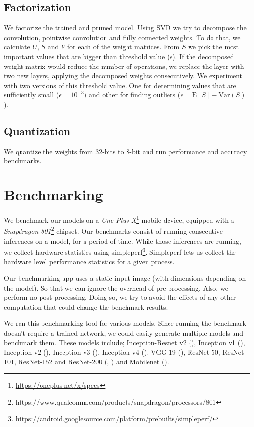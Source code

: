 \subsection{Factorization}
We factorize the trained and pruned model. Using SVD we try to decompose the convolution, pointwise convolution and fully connected weights. To do that, we calculate $U$, $S$ and $V$ for each of the weight matrices. From $S$ we pick the most important values that are bigger than threshold value ($\epsilon$). If the decomposed weight matrix would reduce the number of operations, we replace the layer with two new layers, applying the decomposed weights consecutively. We experiment with two versions of this threshold value. One for determining values that are sufficiently small ($\epsilon = 10^{-3}$) and other for finding outliers ($\epsilon = \text{E}[S] - \text{Var}(S)$).

\subsection{Quantization}
We quantize the weights from 32-bits to 8-bit and run performance and accuracy benchmarks.

\section{Benchmarking}
We benchmark our models on a \textit{One Plus X}\footnote{\url{https://oneplus.net/x/specs}} mobile device, equipped with a \textit{Snapdragon 801}\footnote{\url{https://www.qualcomm.com/products/snapdragon/processors/801}} chipset. Our benchmarks consist of running consecutive inferences on a model, for a period of time. While those inferences are running, we collect hardware statistics using simpleperf\footnote{\url{https://android.googlesource.com/platform/prebuilts/simpleperf/}}. Simpleperf lets us collect the hardware level performance statistics for a given process.

Our benchmarking app uses a static input image (with dimensions depending on the model). So that we can ignore the overhead of pre-processing. Also, we perform no post-processing. Doing so, we try to avoid the effects of any other computation that could change the benchmark results. 

We ran this benchmarking tool for various models. Since running the benchmark doesn't require a trained network, we could easily generate multiple models and benchmark them. These models include; Inception-Resnet v2 (\cite{DBLP:journals/corr/SzegedyIV16}), Inception v1 (\cite{Szegedy:2014aa}), Inception v2 (\cite{Szegedy:2014aa}), Inception v3 (\cite{Szegedy_2016_CVPR}), Inception v4 (\cite{DBLP:journals/corr/SzegedyIV16}), VGG-19 (\cite{Simonyan:2014aa}), ResNet-50, ResNet-101, ResNet-152 and ResNet-200 (\cite{He:2015aa}, \cite{he2016identity}) and Mobilenet (\cite{howard2017mobilenets}).  


